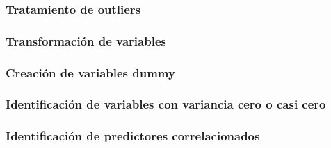 \documentclass[
  10pt,
]{article}
\begin{document}
\hypertarget{tratamiento-de-outliers}{%
\subsubsection{\texorpdfstring{\textbf{Tratamiento de
outliers}}{Tratamiento de outliers}}\label{tratamiento-de-outliers}}

\hypertarget{transformaciuxf3n-de-variables}{%
\subsubsection{\texorpdfstring{\textbf{Transformación de
variables}}{Transformación de variables}}\label{transformaciuxf3n-de-variables}}

\hypertarget{creaciuxf3n-de-variables-dummy}{%
\subsubsection{\texorpdfstring{\textbf{Creación de variables
dummy}}{Creación de variables dummy}}\label{creaciuxf3n-de-variables-dummy}}

\hypertarget{identificaciuxf3n-de-variables-con-variancia-cero-o-casi-cero}{%
\subsubsection{\texorpdfstring{\textbf{Identificación de variables con
variancia cero o casi
cero}}{Identificación de variables con variancia cero o casi cero}}\label{identificaciuxf3n-de-variables-con-variancia-cero-o-casi-cero}}

\hypertarget{identificaciuxf3n-de-predictores-correlacionados}{%
\subsubsection{\texorpdfstring{\textbf{Identificación de predictores
correlacionados}}{Identificación de predictores correlacionados}}\label{identificaciuxf3n-de-predictores-correlacionados}}
\end{document}
